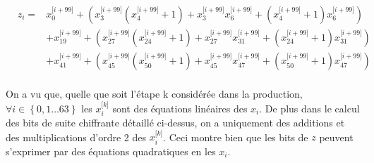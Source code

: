 \begin{equation}
\begin{aligned}
  &z_i =& x^{\lbrack i + 99\rbrack}_0 + (x^{\lbrack i+99\rbrack}_{3}( x^{\lbrack i+99\rbrack}_{4} + 1) + x^{\lbrack i+99\rbrack}_{3} x^{\lbrack i+99\rbrack}_{6} + ( x^{\lbrack i+99\rbrack}_{4} + 1) x^{\lbrack i+99\rbrack}_{6}) \\  
  & &+ x^{\lbrack i + 99\rbrack}_{19} + (x^{\lbrack i+99\rbrack}_{27}(x^{\lbrack i+99\rbrack}_{24} + 1) + x^{\lbrack i+99\rbrack}_{27} x^{\lbrack i+99\rbrack}_{31} + (x^{\lbrack i+99\rbrack}_{24} + 1)x^{\lbrack i+99\rbrack}_{31}) \\  
  & &+ x^{\lbrack i + 99\rbrack}_{41} + (x^{\lbrack i+99\rbrack}_{45} (x^{\lbrack i+99\rbrack}_{50} + 1) + x^{\lbrack i+99\rbrack}_{45} x^{\lbrack i+99\rbrack}_{47} + (x^{\lbrack i+99\rbrack}_{50} + 1)x^{\lbrack i+99\rbrack}_{47}) \\
\end{aligned}
\end{equation}


On a vu que, quelle que soit l'étape k considérée dans la production, $ \forall i \in \left\{ {0,1 \ldots 63}\right\}$ les $x^{\lbrack k \rbrack}_{i}$ sont des équations linéaires des $x_i$. De plus dans le calcul des bits de suite chiffrante détaillé ci-dessus, on a uniquement des additions et des multiplications d'ordre 2 des $x^{\lbrack k \rbrack}_{i}$. Ceci montre bien que les bits de $z$ peuvent s'exprimer par des équations quadratiques en les $x_i$.
